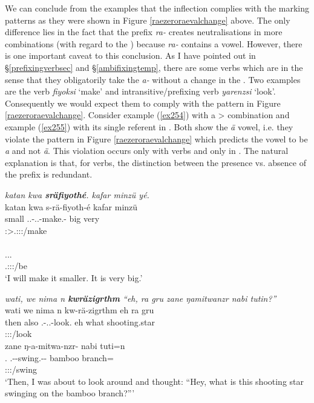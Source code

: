 We can conclude from the examples that the  inflection complies with the  marking patterns as they were shown in Figure \ref{raezeroraevalchange} above. The only difference lies in the fact that the  prefix \emph{ra-} creates neutralisations in more combinations (with regard to the ) because \emph{ra-} contains a vowel. However, there is one important caveat to this conclusion. As I have pointed out in \S{}\ref{prefixingverbsec} and \S{}\ref{ambifixingtemp}, there are some verbs which are  in the sense that they obligatorily take the \emph{a-} without a change in the . Two examples are the  verb \emph{fiyoksi} `make' and intransitive/prefixing verb \emph{yarenzsi} `look'. Consequently we would expect them to comply with the pattern in Figure \ref{raezeroraevalchange}. Consider example (\ref{ex254}) with a \Sg>\Sg{}  combination and example (\ref{ex255}) with its single referent in \Sg{}. Both show the \emph{ä}  vowel, i.e. they violate the pattern in Figure \ref{raezeroraevalchange} which predicts the vowel to be \emph{a} and not \emph{ä}. This violation occurs only with  verbs and only in  . The natural explanation is that, for  verbs, the distinction between the presence vs. absence of the  prefix is redundant.

\begin{exe}
	\ex \emph{katan kwa \textbf{sräfiyothé}. kafar minzü yé.}\\
	\glll katan kwa s-rä-fiyoth-é kafar minzü\\
	small \Fut{} \Tsg.\Masc.\Bet-\Irr.\Ndu.\Vc-make.\Rs-\Fsg{} big very\\
	{} {} \footnotesize{\Fsg:\Sbj>\Tsg.\Masc:\Obj:\Irr:\Pfv/make} {} {}\\
	\sn
	\glll {}\\
	\Tsg.\Masc.\Cop.\Ndu\\
	\footnotesize{\Tsg.\Masc:\Sbj:\Nonpast:\Ipfv/be}\\
	\trans `I will make it smaller. It is very big.'
	\label{ex254}
\end{exe}
\begin{exe}
	\ex \emph{wati, we nima n \textbf{kwräzigrthm} ``eh, ra gru zane ŋamitwanzr nabi tutin?''}\\
	\glll wati we nima n kw-rä-zigrthm eh ra gru\\
	then also \Quot{} \Imn{} \Fsg.\Bet-\Irr.\Ndu.\Vc-look.\Rs{} eh what shooting.star\\
	{} {} {} {} \footnotesize{\Fsg:\Sbj:\Irr:\Pfv/look} {} {} {}\\
	\sn
	\glll zane ŋ-a-mitwa-nzr-\Zero{} nabi tuti=n\\
	\Dem.\Prox{} \M.\Alph-\Vc-swing.\Ext-\Ndu-\Stsg{} bamboo branch=\Loc{}\\
	{} \footnotesize{\Stsg:\Sbj:\Nonpast:\Ipfv/swing} {} {}\\
	\trans `Then, I was about to look around and thought: ``Hey, what is this shooting star swinging on the bamboo branch?'''
	\label{ex255}
\end{exe}

